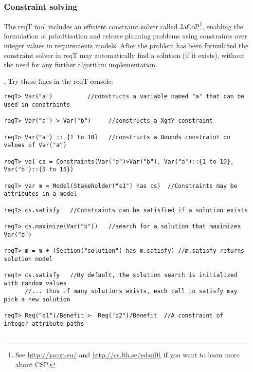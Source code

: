 \documentclass[11pt]{article}
\begin{document}
\clearpage\newpage
\subsubsection{Constraint solving}

The reqT tool includes an efficient constraint solver called JaCoP\footnote{See \url{http://jacop.eu/} and \url{http://cs.lth.se/edan01} if you want to learn more about CSP.}, enabling the formulation of prioritization and release planning problems using constraints over integer values in requirements models. After the problem has been formulated the constraint solver in reqT may automatically find a solution (if it exists), without the need for any further algorithm implementation.  
\begin{framed}
. Try these lines in the reqT console:

{\scriptsize\begin{verbatim}
reqT> Var("a")          //constructs a variable named "a" that can be used in constraints

reqT> Var("a") > Var("b")     //constructs a XgtY constraint

reqT> Var("a") :: {1 to 10}   //constructs a Bounds constraint on values of Var("a")

reqT> val cs = Constraints(Var("a")>Var("b"), Var("a")::{1 to 10}, Var("b")::{5 to 15})

reqT> var m = Model(Stakeholder("s1") has cs)  //Constraints may be attributes in a model

reqT> cs.satisfy   //Constraints can be satisfied if a solution exists

reqT> cs.maximize(Var("b"))   //search for a solution that maximizes Var("b")

reqT> m = m + (Section("solution") has m.satisfy) //m.satisfy returns solution model

reqT> cs.satisfy   //By default, the solution search is initialized with random values
      //... thus if many solutions exists, each call to satisfy may pick a new solution

reqT> Req("q1")/Benefit >  Req("q2")/Benefit  //A constraint of integer attribute paths


\end{verbatim}}
\end{framed}
\end{document}
